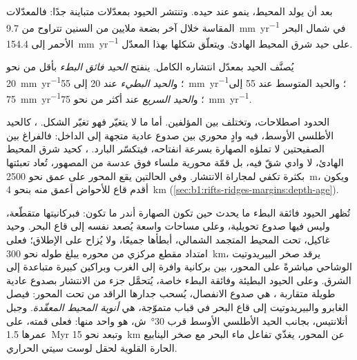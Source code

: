 بعد أن يولد المحيط، ينمو عند حيده. وتنتشر الحيود بمعدّلات متباينة جدًا: فالمعدّلات المقاسة خلال آخر بضعة ملايين من السنين تتراوح من \qty{9.7}{mm.yr^{-1}} في شمال البحر الأحمر إلى \qty{154.4}{mm.yr^{-1}} على حيد شرق المحيط الهادئ. ويتعلّق شكلها بهذا المعدّل.

\begin{definition}\label{def:b1:rifts-ridges-margins:ridge-classes}
يُصنَّف الحيد بمعدّل انتشاره الكامل. ينفتح \emph{الحيد فائق البطء} بأقل من نحو \qty{20}{mm.yr^{-1}}؛ و\emph{الحيد البطيء} عند 20 إلى \qty{55}{mm.yr^{-1}}؛ والحيد المتوسط عند 55 إلى \qty{75}{mm.yr^{-1}}؛ و\emph{الحيد السريع} عند أكثر من نحو \qty{75}{mm.yr^{-1}}.
\end{definition}

الحدود اصطلاحات، وتختلف بين المؤلفين. أما ما لا يتغيّر فهو تغيّر الشكل. ، كالحيد الأطلسي الأوسط، فيه وادٍ محوري بين صدوع عادية متجهة إلى الداخل: فالفراغ بين الصفيحتين لا تملؤه الصهارة بسرعة انفتاحه، فيتكسّر  البارد. ، كحيد شرق المحيط الهادئ، لا وادي شقّ فيه، بل قمّة محورية ملساء فوق عدسة من المصهور، تُعاد تعبئتها بكثرة تكفي لمجاراة الانتشار. وفي الحالتين يقع المحور على عمق نحو \qty{2500}{m}، ويكون أقدم قاع للأحواض أعمق منه بنحو \qty{4}{km} (\cref{sec:b1:rifts-ridges-margins:depth-age}).

تُظهر الحيود فائقة البطء ما يحدث حين تكون الصهارة أندر ما تكون: فبركانيتها متقطّعة، وليس فيها صدوع تحويلية، وعلى مساحات واسعة يُصعد  نفسه إلى قاع البحر. وحيد غاكيل، تحت المحيط المتجمد الشمالي، أبطأها جميعًا، ولا يُزاح على الإطلاق؛ فعلى امتداد مقطع مركزي من محوره يبلغ طوله نحو \qty{300}{km}، يرقد صخر البيريدوتيت الوشاحي مباشرةً على المحور، بين بركانية وافرة إلى الغرب وبراكين كبيرة متباعدة إلى الشرق. وعلى الحيود البطيئة وفائقة البطء خاصة، يُتحمَّل جزء من الانتشار بصدوع عادية طويلة متقاربة ، هي صدوع الانفصال، يُسحب جدارها الراقد من تحت المحور: فيصل الغابرو والبيريدوتيت إلى قاع البحر في قباب متموّجة، هي \emph{أنوية المحيط المعقّدة}. وجبل أتلانتيس، بجانب الحيد الأطلسي الأوسط قرب \ang{30}~ش، هو واحد منها: فعلى قمته، على  عمرها \qty{1.5}{Myr} وتبعد نحو \qty{15}{km} عن المحور، يغذّي تفاعل ماء البحر مع صخر  الينابيع الحارة القلوية لحقل لوست سيتي الحراري.

